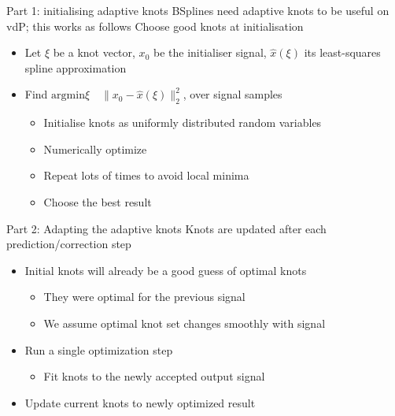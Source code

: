 \documentclass[presentation]{beamer}
\begin{document}
\begin{frame}[label={sec:orgf70df23}]{Part 1: initialising adaptive knots}
BSplines need adaptive knots to be useful on vdP; this works as follows
\vfill
Choose good knots at initialisation
\begin{itemize}
\item Let \(\xi\) be a knot vector, \(x_0\) be the initialiser signal, \(\hat{x}(\xi)\) its least-squares spline approximation
\item Find \(\mathrm{argmin }\xi \quad \|x_0 - \hat{x}(\xi)\|_2^2\), over signal samples
\begin{itemize}
\item Initialise knots as uniformly distributed random variables
\item Numerically optimize
\item Repeat lots of times to avoid local minima
\item Choose the best result
\end{itemize}
\end{itemize}
\end{frame}

\begin{frame}[label={sec:org7c8ea01}]{Part 2: Adapting the adaptive knots}
Knots are updated after each prediction/correction step
\vfill
\begin{itemize}
\item Initial knots will already be a good guess of optimal knots
\begin{itemize}
\item They were optimal for the previous signal
\item We assume optimal knot set changes smoothly with signal
\end{itemize}
\item Run a single optimization step
\begin{itemize}
\item Fit knots to the newly accepted output signal
\end{itemize}
\item Update current knots to newly optimized result
\end{itemize}
\end{frame}
\end{document}
